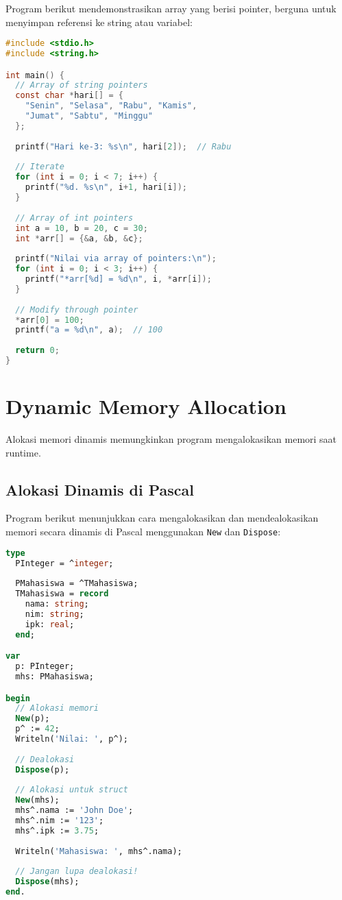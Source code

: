 \documentclass[../main.tex]{subfiles}
\begin{document}
Program berikut mendemonstrasikan array yang berisi pointer, berguna untuk menyimpan referensi ke string atau variabel:

\begin{lstlisting}[language=C, caption={Array of pointers di C}]
#include <stdio.h>
#include <string.h>

int main() {
  // Array of string pointers
  const char *hari[] = {
    "Senin", "Selasa", "Rabu", "Kamis",
    "Jumat", "Sabtu", "Minggu"
  };
  
  printf("Hari ke-3: %s\n", hari[2]);  // Rabu
  
  // Iterate
  for (int i = 0; i < 7; i++) {
    printf("%d. %s\n", i+1, hari[i]);
  }
  
  // Array of int pointers
  int a = 10, b = 20, c = 30;
  int *arr[] = {&a, &b, &c};
  
  printf("Nilai via array of pointers:\n");
  for (int i = 0; i < 3; i++) {
    printf("*arr[%d] = %d\n", i, *arr[i]);
  }
  
  // Modify through pointer
  *arr[0] = 100;
  printf("a = %d\n", a);  // 100
  
  return 0;
}
\end{lstlisting}

\section{Dynamic Memory Allocation}

Alokasi memori dinamis memungkinkan program mengalokasikan memori saat runtime.

\subsection{Alokasi Dinamis di Pascal}

Program berikut menunjukkan cara mengalokasikan dan mendealokasikan memori secara dinamis di Pascal menggunakan \texttt{New} dan \texttt{Dispose}:

\begin{lstlisting}[language=Pascal, caption={New dan Dispose di Pascal}]
type
  PInteger = ^integer;
  
  PMahasiswa = ^TMahasiswa;
  TMahasiswa = record
    nama: string;
    nim: string;
    ipk: real;
  end;

var
  p: PInteger;
  mhs: PMahasiswa;

begin
  // Alokasi memori
  New(p);
  p^ := 42;
  Writeln('Nilai: ', p^);
  
  // Dealokasi
  Dispose(p);
  
  // Alokasi untuk struct
  New(mhs);
  mhs^.nama := 'John Doe';
  mhs^.nim := '123';
  mhs^.ipk := 3.75;
  
  Writeln('Mahasiswa: ', mhs^.nama);
  
  // Jangan lupa dealokasi!
  Dispose(mhs);
end.
\end{lstlisting}
\end{document}
